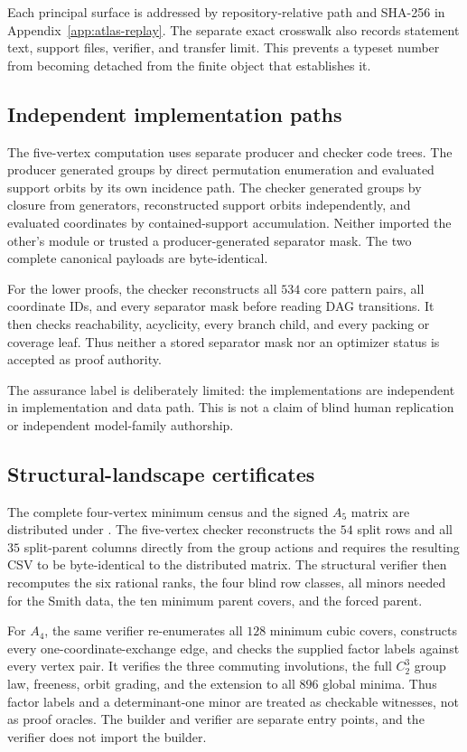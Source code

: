 Each principal surface is addressed by repository-relative path and SHA-256
in Appendix~\ref{app:atlas-replay}.  The separate exact crosswalk
also records statement text, support files, verifier, and
transfer limit.  This prevents a typeset number from becoming detached from
the finite object that establishes it.

\subsection{Independent implementation paths}

The five-vertex computation uses separate producer and checker code trees.  The
producer generated groups by direct permutation enumeration and evaluated
support orbits by its own incidence path.  The checker generated groups by
closure from generators, reconstructed support orbits independently, and
evaluated coordinates by contained-support accumulation.  Neither imported
the other's module or trusted a producer-generated separator mask.  The two
complete canonical payloads are byte-identical.

For the lower proofs, the checker reconstructs all $534$ core pattern pairs,
all coordinate IDs, and every separator mask before reading DAG transitions.
It then checks reachability, acyclicity, every branch child, and every packing
or coverage leaf.  Thus neither a stored separator mask nor an optimizer
status is accepted as proof authority.

The assurance label is deliberately limited: the implementations are independent in
implementation and data path.  This is not a claim of blind human replication
or independent model-family authorship.

\subsection{Structural-landscape certificates}

The complete four-vertex minimum census and the signed $A_5$ matrix are
distributed under .  The five-vertex checker
reconstructs the $54$ split rows and all $35$ split-parent columns directly
from the group actions and requires the resulting CSV to be byte-identical to
the distributed matrix.  The structural verifier then recomputes the six
rational ranks, the four blind row classes, all minors needed for the Smith
data, the ten minimum parent covers, and the forced parent.

For $A_4$, the same verifier re-enumerates all $128$ minimum cubic covers,
constructs every one-coordinate-exchange edge, and checks the supplied factor
labels against every vertex pair.  It verifies the three commuting
involutions, the full $C_2^3$ group law, freeness, orbit grading, and the
extension to all $896$ global minima.  Thus factor labels and a determinant-one
minor are treated as checkable witnesses, not as proof oracles.  The builder
and verifier are separate entry points, and the verifier does not import the
builder.

